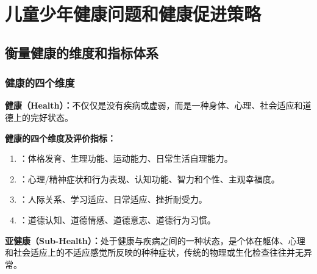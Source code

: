 \chapter{儿童少年健康问题和健康促进策略}
\setcounter{chapter}{7}

\section{衡量健康的维度和指标体系}
\label{sec:health-dimensions}

\subsection{健康的四个维度}

\begin{defbox}
\textbf{健康（Health）：}不仅仅是没有疾病或虚弱，而是一种身体、心理、社会适应和道德上的完好状态。
\end{defbox}

\begin{keybox}
\textbf{健康的四个维度及评价指标：}

\begin{enumerate}[leftmargin=*]
    \item {}：体格发育、生理功能、运动能力、日常生活自理能力。
    \item {}：心理/精神症状和行为表现、认知功能、智力和个性、主观幸福度。
    \item {}：人际关系、学习适应、日常适应、挫折耐受力。
    \item {}：道德认知、道德情感、道德意志、道德行为习惯。
\end{enumerate}

\vspace{4pt}
\textbf{亚健康（Sub-Health）：}处于健康与疾病之间的一种状态，是个体在躯体、心理和社会适应上的不适应感觉所反映的种种症状，传统的物理或生化检查往往并无异常。
\end{keybox}

